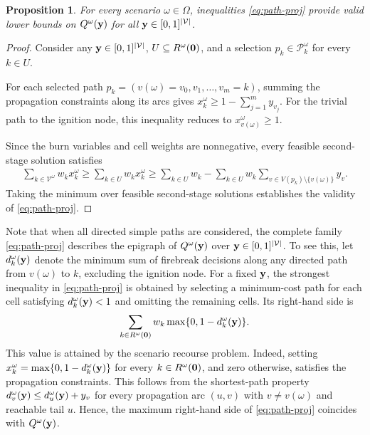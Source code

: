 \documentclass{itor}
\newtheorem{proposition}{Proposition}
\begin{document}
\begin{proposition}
\label{prop:path}
For every scenario $\omega \in \Omega$, inequalities
\eqref{eq:path-proj} provide valid lower bounds on
$Q^\omega(\vb{y})$ for all
$\vb{y} \in [0,1]^{|\mathcal{V}|}$.
\end{proposition}

\begin{proof}
Consider any $\vb{y} \in [0,1]^{|\mathcal{V}|}$,
$U \subseteq R^\omega(\vb{0})$, and a selection
$p_k \in \mathcal{P}_k^\omega$ for every $k \in U$.

For each selected path
$p_k=(v(\omega)=v_0,v_1,\ldots,v_m=k)$,
summing the propagation constraints along its arcs gives $x_k^\omega \geq
1-\sum_{j=1}^{m}y_{v_j}$. For the trivial path to the ignition node, this
inequality reduces to $x_{v(\omega)}^\omega \geq 1$.

Since the burn variables and cell weights are nonnegative,
every feasible second-stage solution satisfies
%
\begin{align*}
\sum_{k \in \mathcal{V}^\omega}w_k x_k^\omega
\geq
\sum_{k \in U}w_k x_k^\omega
\nonumber
\geq
\sum_{k \in U}w_k
-
\sum_{k \in U}w_k
\sum_{v \in V(p_k)\setminus\{v(\omega)\}}y_v.
\end{align*}
%
Taking the minimum over feasible second-stage solutions
establishes the validity of \eqref{eq:path-proj}.
\end{proof}

Note that when all directed simple paths are considered, the complete family \eqref{eq:path-proj} describes the epigraph of $Q^\omega(\vb{y})$ over
$\vb{y} \in [0,1]^{|\mathcal{V}|}$.  To see this, let $d_k^\omega(\vb{y})$ denote the minimum
sum of firebreak decisions along any directed path from
$v(\omega)$ to $k$, excluding the ignition node.
For a fixed $\vb{y}$, the strongest inequality in
\eqref{eq:path-proj} is obtained by selecting a
minimum-cost path for each cell satisfying
$d_k^\omega(\vb{y})<1$ and omitting the remaining cells.
Its right-hand side is
%
\[
\sum_{k \in R^\omega(\vb{0})}
w_k\max\{0,1-d_k^\omega(\vb{y})\}.
\]
%
This value is attained by the scenario recourse problem.
Indeed, setting
$x_k^\omega=\max\{0,1-d_k^\omega(\vb{y})\}$
for every $k \in R^\omega(\vb{0})$, and zero otherwise,
satisfies the propagation constraints.
This follows from the shortest-path property
$d_v^\omega(\vb{y})\leq d_u^\omega(\vb{y})+y_v$
for every propagation arc $(u,v)$ with
$v\neq v(\omega)$ and reachable tail $u$.
Hence, the maximum right-hand side of
\eqref{eq:path-proj} coincides with
$Q^\omega(\vb{y})$.
\end{document}
